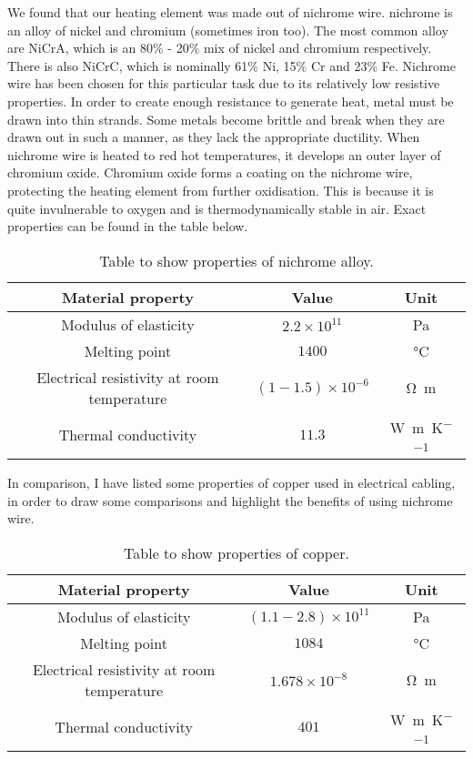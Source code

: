 \documentclass[12pt,a4paper, twoside]{report}
\begin{document}
We found that our heating element was made out of nichrome wire. nichrome is an alloy of nickel and chromium (sometimes iron too). The most common alloy are NiCrA, which is an 80\% - 20\% mix of nickel and chromium respectively. There is also NiCrC, which is nominally 61\% Ni, 15\% Cr and 23\% Fe. Nichrome wire has been chosen for this particular task due to its relatively low resistive properties. In order to create enough resistance to generate heat, metal must be drawn into thin strands. Some metals become brittle and break when they are drawn out in such a manner, as they lack the appropriate ductility. When nichrome wire is heated to red hot temperatures, it develops an outer layer of chromium oxide. Chromium oxide forms a coating on the nichrome wire, protecting the heating element from further oxidisation. This is because it is quite invulnerable to oxygen and is thermodynamically stable in air. Exact properties can be found in the table below.

\begin{table}[H]
  \begin{center}
    \begin{tabular}{|c|c|c|}
      \hline
      Material property & Value & Unit\\
      \hline
      Modulus of elasticity & $2.2 \times 10^{11}$ & \si{\pascal}\\
      Melting point & $1400$ & \si{\celsius}\\
      Electrical resistivity at room temperature & $(1-1.5) \times 10^{-6}$ & \si{\ohm \meter}\\
      Thermal conductivity & $11.3$ & \si{\watt \per \meter \per \kelvin}\\
      \hline
    \end{tabular}
    \caption{Table to show properties of nichrome alloy.}
  \end{center}
\end{table}

In comparison, I have listed some properties of copper used in electrical cabling, in order to draw some comparisons and highlight the benefits of using nichrome wire.

\begin{table}[H]
  \begin{center}
    \begin{tabular}{|c|c|c|}
      \hline
      Material property & Value & Unit\\
      \hline
      Modulus of elasticity & $(1.1 - 2.8) \times 10^{11}$ & \si{\pascal}\\
      Melting point & $1084$ & \si{\celsius}\\
      Electrical resistivity at room temperature & $1.678 \times 10^{-8}$ & \si{\ohm \meter}\\
      Thermal conductivity & $401$ & \si{\watt \per \meter \per \kelvin}\\
      \hline
    \end{tabular}
    \caption{Table to show properties of copper.}
  \end{center}
\end{table}
\end{document}

